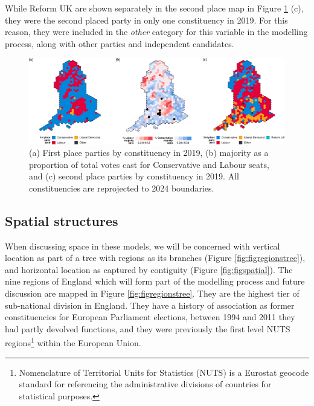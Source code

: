 \documentclass[webpdf,large,contemporary,namedate]{oup-authoring-template}
\theoremstyle{thmstyleone}
\theoremstyle{thmstyletwo}
\theoremstyle{thmstylethree}
\begin{document}
While Reform UK are shown separately in the second place map in Figure
\ref{fig:figplacement} (c), they were the second placed party in only
one constituency in 2019. For this reason, they were included in the
\emph{other} category for this variable in the modelling process, along
with other parties and independent candidates.

\begin{figure}[th]
\includegraphics[width=1\linewidth]{jrss_resubmission3_files/figure-latex/figplacement-1} \caption{(a) First place parties by constituency in 2019, (b) majority as a proportion of total votes cast for Conservative and Labour seats, and (c) second place parties by constituency in 2019. All constituencies are reprojected to 2024 boundaries.}\label{fig:figplacement}
\end{figure}

\subsection{Spatial structures}\label{spatial-structures}

When discussing space in these models, we will be concerned with
vertical location as part of a tree with regions as its branches (Figure
\ref{fig:figregionstree}), and horizontal location as captured by
contiguity (Figure \ref{fig:figspatial}). The nine regions of England
which will form part of the modelling process and future discussion are
mapped in Figure \ref{fig:figregionstree}. They are the highest tier of
sub-national division in England. They have a history of association as
former constituencies for European Parliament elections, between 1994
and 2011 they had partly devolved functions, and they were previously
the first level NUTS regions\footnote{Nomenclature of Territorial Units
  for Statistics (NUTS) is a Eurostat geocode standard for referencing
  the administrative divisions of countries for statistical purposes.}
within the European Union.
\end{document}
